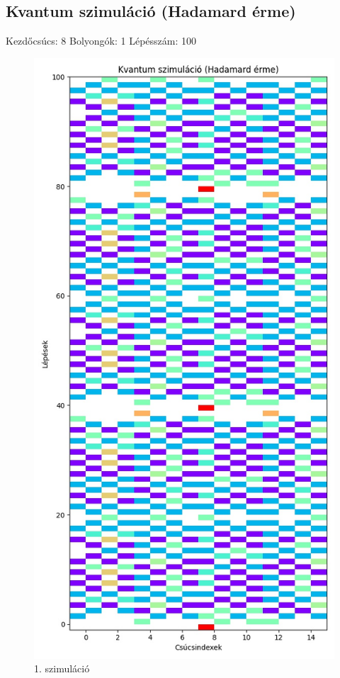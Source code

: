 \documentclass[14pt,a4paper]{article}
\begin{document}
\subsection{Kvantum szimuláció (Hadamard érme)}
Kezdőcsúcs: 8
Bolyongók: 1
Lépésszám: 100
\begin{figure}[H]
\centering
\includegraphics[width = 0.7\columnwidth]{sim_01/counts.jpg}
\caption{1. szimuláció}
\end{figure}
\end{document}
